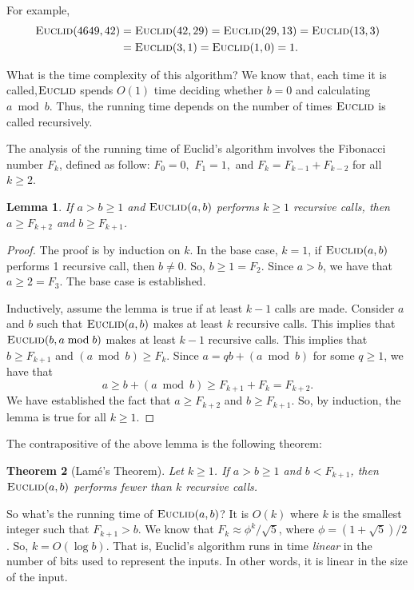 \documentclass{article}
\newtheorem{lemma}{Lemma}[section]
\newtheorem{theorem}[lemma]{Theorem}
\begin{document}
\begin{itemize}
For example, 
\begin{align*}
\textnormal{\scshape Euclid}(4649, 42) &= \textnormal{\scshape Euclid}(42, 29) = \textnormal{\scshape Euclid}(29, 13) = \textnormal{\scshape Euclid}(13, 3)\\ &= \textnormal{\scshape Euclid}(3, 1) = \textnormal{\scshape Euclid}(1, 0) = 1.
\end{align*}

What is the time complexity of this algorithm? We know that, each time it is called,$\textnormal{\scshape Euclid}$ spends $O(1)$ time deciding whether $b = 0$ and calculating $a \bmod b$. Thus, the running time depends on the number of times $\textnormal{\scshape Euclid}$ is called recursively.

The analysis of the running time of Euclid's algorithm involves the Fibonacci number $F_k$, defined as follow: $F_0 = 0,$ $F_1 = 1,$ and $F_k = F_{k-1} + F_{k-2}$ for all $k \geq 2$.

\begin{lemma}
If $a > b \geq 1$ and $\textnormal{\scshape Euclid}(a,b)$ performs $k \geq 1$ recursive calls, then $a \geq F_{k+2}$ and $b \geq F_{k+1}$.
\end{lemma}
\begin{proof}
The proof is by induction on $k$. In the base case, $k = 1$, if $\textnormal{\scshape Euclid}(a,b)$ performs 1 recursive call, then $b \neq 0$. So, $b \geq 1 = F_2$. Since $a > b$, we have that $a \geq 2 = F_3$. The base case is established.

Inductively, assume the lemma is true if at least $k-1$ calls are made. Consider $a$ and $b$ such that $\textnormal{\scshape Euclid}(a,b)$ makes at least $k$ recursive calls. This implies that $\textnormal{\scshape Euclid}(b, a \bmod b)$ makes at least $k-1$ recursive calls. This implies that $b \geq F_{k+1}$ and $(a \bmod b) \geq F_k$. Since $a = qb + (a \bmod b)$ for some $q \geq 1$, we have that 
$$a \geq b + (a \bmod b) \geq F_{k+1} + F_{k} = F_{k+2}.$$ We have established the fact that $a \geq F_{k+2}$ and $b \geq F_{k+1}$. So, by induction, the lemma is true for all $k \geq 1$.
\end{proof}

The contrapositive of the above lemma is the following theorem:
\begin{theorem}[Lam\'{e}'s Theorem]
Let $k \geq 1$. If $a > b \geq 1$ and $b < F_{k+1}$, then $\textnormal{\scshape Euclid}(a,b)$ performs fewer than $k$ recursive calls.
\end{theorem}

So what's the running time of $\textnormal{\scshape Euclid}(a,b)$? It is $O(k)$ where $k$ is the smallest integer such that $F_{k+1} > b$. We know that $F_k \approx \phi^k / \sqrt{5}$, where $\phi = (1+\sqrt{5})/2$. So, $k = O(\log b)$. That is, Euclid's algorithm runs in time \emph{linear} in the number of bits used to represent the inputs. In other words, it is linear in the size of the input.


\end{itemize}
\end{document}

